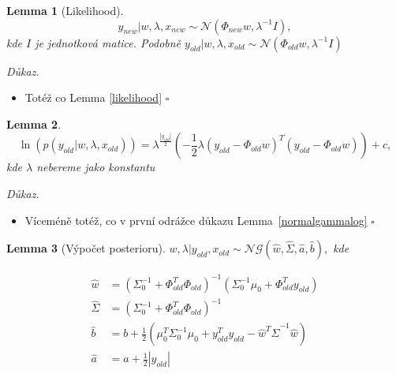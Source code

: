 \documentclass{article}
\newenvironment{pitemize}{
\begin{itemize}
  \setlength{\itemsep}{5pt}
  \setlength{\parskip}{0pt}
  \setlength{\parsep}{0pt}
}{\end{itemize}}
\newenvironment{pproof}{
\noindent\emph{Důkaz.}
\begin{pitemize}
}{\hfill$\square$\end{pitemize}}
\newcommand{\NN}{\mathcal{N}}
\newcommand{\NoG}{\mathcal{NG}}
\newtheorem{lemma}{Lemma}
\theoremstyle{definition}
\begin{document}
\begin{lemma}[Likelihood]
\label{likelihood_2}
$$y_{new}|w,\lambda,x_{new}\sim\NN(\Phi_{new}w,\lambda^{-1}I),$$ kde $I$ je jednotková matice.
 Podobně $y_{old}|w,\lambda,x_{old}\sim\NN(\Phi_{old}w,\lambda^{-1}I)$\end{lemma}

\begin{pproof}
\item Totéž co Lemma \ref{likelihood}
\end{pproof}

\begin{lemma}
\label{log_likelihood_2}
$$\ln(p(y_{old}|w,\lambda,x_{old}))=\lambda^{\frac{\left|y_{old}\right|}{2}}\left(-\frac{1}{2}\lambda
\left(y_{old}-\Phi _{old}w\right)^T\left(y_{old}-\Phi _{old}w\right)\right)+c,$$
kde $\lambda$ nebereme jako konstantu
\end{lemma}

\begin{pproof}
\item Víceméně totéž, co v první odrážce důkazu Lemma~\ref{normalgammalog}
\end{pproof}

\begin{lemma}[Výpočet posterioru]
\label{vypocet_posterior_2}
$w,\lambda|y_{old},x_{old} \sim \NoG(\hat{w},\hat{\Sigma},\hat{a},\hat{b}),$ kde

\begin{align*}
\hat{w} &= (\Sigma_0^{-1}+\Phi _{old}^T\Phi _{old})^{-1}(\Sigma_0^{-1}\mu_0+\Phi _{old}^Ty_{old}) \\
\hat{\Sigma} &= (\Sigma_0^{-1}+\Phi _{old}^T\Phi _{old})^{-1} \\
\hat{b} &= b+\frac{1}{2}(\mu_0^T\Sigma_0^{-1}\mu_0+y_{old}^Ty_{old}
-\hat{w}^T\hat{\Sigma}^{-1}\hat{w})\\
\hat{a} &= a+\frac{1}{2}\left|y_{old}\right|
\end{align*}

\end{lemma}
\end{document}
